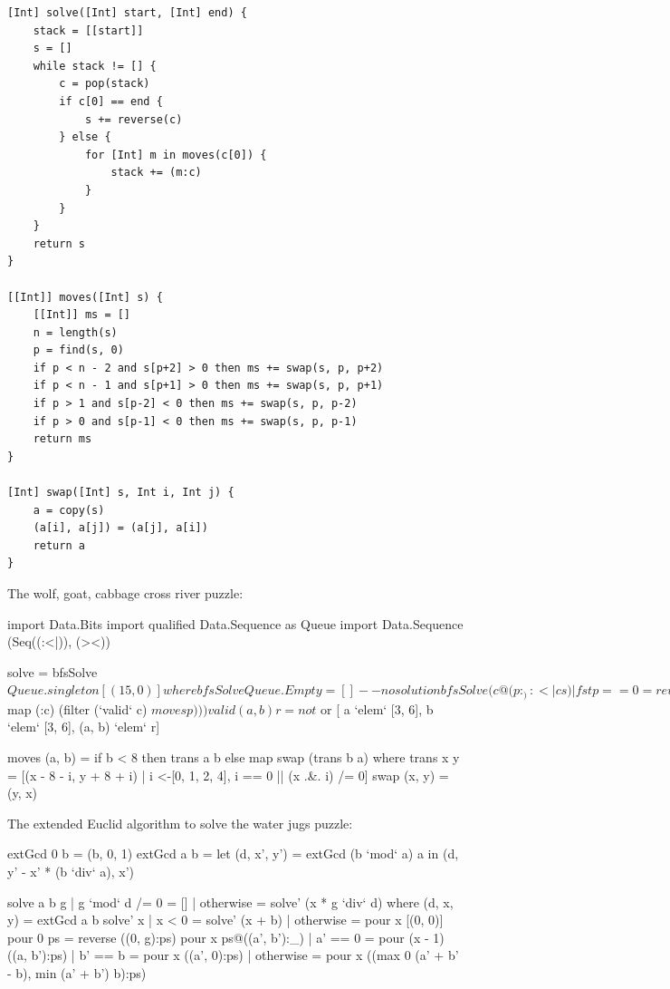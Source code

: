\documentclass[b5paper]{article}
\begin{document}
\begin{lstlisting}[language = Bourbaki]
[Int] solve([Int] start, [Int] end) {
    stack = [[start]]
    s = []
    while stack != [] {
        c = pop(stack)
        if c[0] == end {
            s += reverse(c)
        } else {
            for [Int] m in moves(c[0]) {
                stack += (m:c)
            }
        }
    }
    return s
}

[[Int]] moves([Int] s) {
    [[Int]] ms = []
    n = length(s)
    p = find(s, 0)
    if p < n - 2 and s[p+2] > 0 then ms += swap(s, p, p+2)
    if p < n - 1 and s[p+1] > 0 then ms += swap(s, p, p+1)
    if p > 1 and s[p-2] < 0 then ms += swap(s, p, p-2)
    if p > 0 and s[p-1] < 0 then ms += swap(s, p, p-1)
    return ms
}

[Int] swap([Int] s, Int i, Int j) {
    a = copy(s)
    (a[i], a[j]) = (a[j], a[i])
    return a
}
\end{lstlisting}

The wolf, goat, cabbage cross river puzzle:

\begin{Haskell}
import Data.Bits
import qualified Data.Sequence as Queue
import Data.Sequence (Seq((:<|)), (><))

solve = bfsSolve $ Queue.singleton [(15, 0)] where
  bfsSolve Queue.Empty = [] -- no solution
  bfsSolve (c@(p:_) :<| cs)
    | fst p == 0 = reverse c
    | otherwise = bfsSolve (cs >< (Queue.fromList $ map (:c)
                                    (filter (`valid` c) $ moves p)))

valid (a, b) r = not $ or [ a `elem` [3, 6], b `elem` [3, 6], (a, b) `elem` r]

moves (a, b) = if b < 8 then trans a b else map swap (trans b a) where
    trans x y = [(x - 8 - i, y + 8 + i)
                     | i <-[0, 1, 2, 4], i == 0 || (x .&. i) /= 0]
    swap (x, y) = (y, x)
\end{Haskell}

The extended Euclid algorithm to solve the water jugs puzzle:

\begin{Haskell}
extGcd 0 b = (b, 0, 1)
extGcd a b = let (d, x', y') = extGcd (b `mod` a) a in
               (d, y' - x' * (b `div` a), x')

solve a b g | g `mod` d /= 0 = []
            | otherwise = solve' (x * g `div` d)
    where
      (d, x, y) = extGcd a b
      solve' x | x < 0 = solve' (x + b)
               | otherwise = pour x [(0, 0)]
      pour 0 ps = reverse ((0, g):ps)
      pour x ps@((a', b'):_) | a' == 0 = pour (x - 1) ((a, b'):ps)
                             | b' == b = pour x ((a', 0):ps)
                             | otherwise = pour x ((max 0 (a' + b' - b),
                                                    min (a' + b') b):ps)
\end{Haskell}
\end{document}
